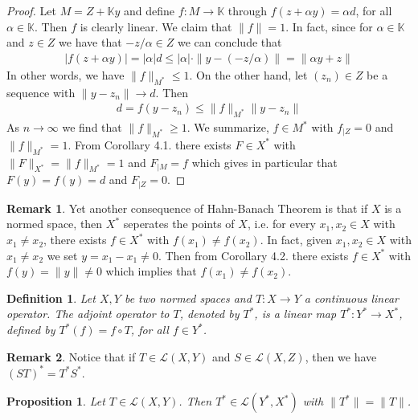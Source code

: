 \documentclass[11pt,a4paper]{article}
\newtheorem{prop}{Proposition}[section]
\newtheorem{defn}{Definition}[section]
\theoremstyle{definition}
\newtheorem{rem}{Remark}[section]
\begin{document}
\begin{proof}
Let $M= Z + \mathbb{K}y$ and define $f: M \to \mathbb{K}$ through $f(z + \alpha y) = \alpha d$, for all $\alpha \in \mathbb{K}$. Then $f$ is clearly linear. We claim that $\|f\|=1$. In fact, since for $\alpha \in \mathbb{K}$ and $z \in Z$ we have that $-z/ \alpha \in Z$ we can conclude that
\begin{align*}
|f(z+ \alpha y)|= | \alpha| d \leq | \alpha| \cdot \| y-(-z/ \alpha)\| = \| \alpha y + z \|
\end{align*}
In other words, we have $\|f\|_{M^*} \leq 1$. On the other hand, let $(z_n) \in Z$ be a sequence with $\| y -z_n\| \to d$. Then 
\begin{align*}
d = f(y-z_n) \leq \| f\|_{M^*} \| y -z_n \|
\end{align*}
As $n \to \infty$ we find that $\|f\|_{M^*} \geq 1$. We summarize, $f \in M^*$ with $f_{ \mid Z}=0$ and $\|f\|_{M^*}=1$. From Corollary 4.1. there exists $F \in X^*$ with $\|F\|_{X^*}=\|f\|_{M^*}=1$ and $F_{\mid M} = f$ which gives in particular that $F(y)=f(y)=d$ and $F_{ \mid Z}=0$.
\end{proof}
\begin{rem} Yet another consequence of Hahn-Banach Theorem is that if $X$ is a normed space, then $X^*$ seperates the points of $X$, i.e. for every $x_1,x_2 \in X$ with $x_1 \neq x_2$, there exists $f \in X^*$ with $f(x_1) \neq f(x_2)$. In fact, given $x_1,x_2 \in X$ with $x_1 \neq x_2$ we set $y=x_1-x_1 \neq 0$. Then from Corollary 4.2. there exists $f \in X^*$ with $f(y)= \|y\| \neq 0$ which implies that $f(x_1) \neq f(x_2)$. 
\end{rem}
\newpage
\begin{defn} Let $X,Y$ be two normed spaces and $T:X \to Y$ a continuous linear operator. The adjoint operator to $T$, denoted by $T^*$, is a linear map $T^*: Y^* \to X^*$, defined by $T^*(f)=f \circ T$, for all $f  \in Y^*$. 
\end{defn}
\begin{rem} Notice that if $T \in \mathcal{L}(X,Y)$ and $S \in \mathcal{L}(X,Z)$, then we have $(ST)^*= T^*S^*$. 
\end{rem}
\begin{prop} Let $T \in \mathcal{L}(X,Y)$. Then $T^* \in \mathcal{L}(Y^*, X^*)$ with $\|T^*\|= \|T\|$. 
\end{prop}
\end{document}
